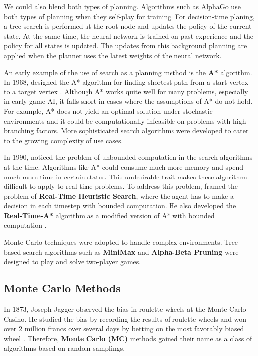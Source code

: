 \documentclass[12pt]{article}
\newcommand{\note}[1]{\todo[color=yellow!40,bordercolor=none,linecolor=black]{~~ #1}}
\begin{document}
We could also blend both types of planning.
Algorithms such as AlphaGo use both types of planning when they self-play for training.
For decision-time planing, a tree search is performed at the root node and updates the policy of the current state.
At the same time, the neural network is trained on past experience and the policy for all states is updated.
The updates from this background planning are applied when the planner uses the latest weights of the neural network.


An early example of the use of search as a planning method is the \textbf{A*} algorithm.
In 1968, \citeauthor{FormalBasisHeuristic_Hart.Nilsson.ea_1968} designed the A* algorithm for finding shortest path from a start vertex to a target vertex \cite{FormalBasisHeuristic_Hart.Nilsson.ea_1968}.
Although A* works quite well for many problems, especially in early game AI, it falls short in cases where the assumptions of A* do not hold.
For example, A* does not yield an optimal solution under stochastic environments and it could be computationally infeasible on problems with high branching factors.
More sophisticated search algorithms were developed to cater to the growing complexity of use cases.

In 1990, \citeauthor{RealtimeHeuristicSearch_Korf_1990} noticed the problem of unbounded computation in the search algorithms at the time.
Algorithms like A* could consume much more memory and spend much more time in certain states.
This undesirable trait makes these algorithms difficult to apply to real-time problems.
To address this problem, \citeauthor{RealtimeHeuristicSearch_Korf_1990} framed the problem of \textbf{Real-Time Heuristic Search},
where the agent has to make a decision in each timestep with bounded computation.
He also developed the \textbf{Real-Time-A*} algorithm as a modified version of A* with bounded computation \cite{RealtimeHeuristicSearch_Korf_1990}.

Monte Carlo techniques were adopted to handle complex environments.
Tree-based search algorithms such as \textbf{MiniMax} and \textbf{Alpha-Beta Pruning} were designed to play and solve two-player games.
\note{find the right citation}

\subsection{Monte Carlo Methods}
In 1873, Joseph Jagger observed the bias in roulette wheels at the Monte Carlo Casino.
He studied the bias by recording the results of roulette wheels and won over 2 million francs over several days by betting on the most favorably biased wheel \cite{MonteCarloCasino__2022}.
Therefore, \textbf{Monte Carlo (MC)} methods gained their name as a class of algorithms based on random samplings.
\end{document}
